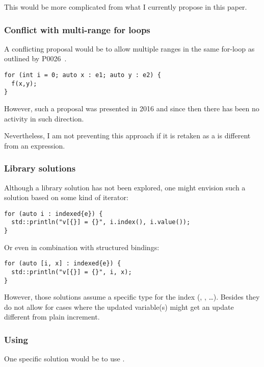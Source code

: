 This would be more complicated from what I currently propose in this paper.

\subsubsection{Conflict with multi-range for loops}

A conflicting proposal would be to allow multiple ranges in the same for-loop as
outlined by P0026~\cite{p0026}. 

\begin{lstlisting}
for (int i = 0; auto x : e1; auto y : e2) {
  f(x,y);
}
\end{lstlisting}

However, such a proposal was presented in 2016
and since then there has been no activity in such direction.

Nevertheless, I am not preventing this approach if it is retaken as a
 is different from an expression.

\subsubsection{Library solutions}

Although a library solution has not been explored, one might envision such a
solution based on some kind of iterator:

\begin{lstlisting}
for (auto i : indexed{e}) {
  std::println("v[{}] = {}", i.index(), i.value());
}
\end{lstlisting}

Or even in combination with structured bindings:

\begin{lstlisting}
for (auto [i, x] : indexed{e}) {
  std::println("v[{}] = {}", i, x);
}
\end{lstlisting}

However, those solutions assume a specific type for the index (,
, \ldots). Besides they do not allow for cases where the
updated variable(s) might get an update different from plain increment.

\subsubsection{Using }

One specific solution would be to use .

